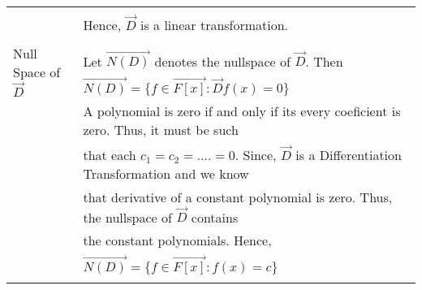 \documentclass[journal,12pt,twocolumn]{IEEEtran}
\begin{document}
\begin{table}[hp]
\begin{tabular}{|l|l|}
		& \\
		& Hence, $\vec{D}$ is a linear transformation.\\
		& \\
		\hline
		\multirow{3}{*}{Null Space of $\vec{D}$} & \\
		& Let $\vec{N(D)}$ denotes the nullspace of $\vec{D}$. Then\\
		& \qquad \qquad \qquad \qquad \qquad $\vec{N(D)} = \{f \in\vec{F[x]} : \vec{D}f(x) = 0 \}$\\
		& A polynomial is zero if and only if its every coeficient is zero. Thus, it must be such  \\
		& that each $c_1 = c_2 = ....=0$. Since, $\vec{D}$ is a Differentiation Transformation and we know \\
		& that derivative of a constant polynomial is zero. Thus, the nullspace of $\vec{D}$ contains \\
		& the constant polynomials. Hence,\\
		& \qquad \qquad \qquad \qquad \qquad $\vec{N(D)} =\{f \in \vec{F[x]} : f(x) = c \}$ \\
		& \\
		\hline
	\end{tabular}
\end{table}
\end{document}

